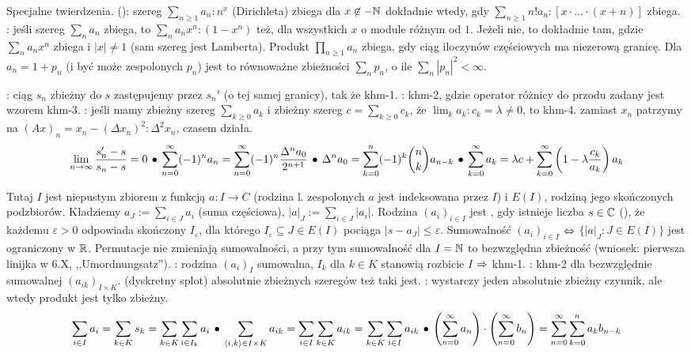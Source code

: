 Specjalne twierdzenia.
 (): szereg $\sum_{n \ge 1} a_n : n^x$ (Dirichleta) zbiega dla $x \not \in - \mathbb{N}$ dokładnie wtedy, gdy $\sum_{n \ge 1} n! a_n : [x \cdot \ldots \cdot (x+n)]$ zbiega.
: jeśli szereg $\sum_n a_n$ zbiega, to $\sum_n a_n x^n : (1 - x^n)$ też, dla wszystkich $x$ o module różnym od $1$.
Jeżeli nie, to dokładnie tam, gdzie $\sum_n a_nx^n$ zbiega i $|x| \neq 1$ (sam szereg jest Lamberta).
Produkt $\prod_{n \ge 1} a_n$ zbiega, gdy ciąg iloczynów częściowych ma niezerową granicę.
Dla $a_n = 1 + p_n$ (i być może zespolonych $p_n$) jest to równoważne zbieżności $\sum_n p_n$, o ile $\sum_n |p_n|^2 < \infty$.

:  ciąg $s_n$ zbieżny do $s$ zastępujemy przez $s_n'$ (o tej samej granicy), tak że khm-1.
: khm-2, gdzie operator różnicy do przodu zadany jest wzorem khm-3.
: jeśli mamy zbieżny szereg $\sum_{k \ge 0} a_k$ i zbieżny szereg $c = \sum_{k \ge 0} c_k$, że $\lim_k a_k : c_k = \lambda \neq 0$, to khm-4. 
 zamiast $x_n$ patrzymy na $(Ax)_n = x_n - (\Delta x_n)^2 : \Delta^2 x_n$, czasem działa. %
\[
	\lim_{n \to \infty} \frac{s_n' - s}{s_n - s} = 0 \, \bullet \,
	\sum_{n=0}^\infty (-1)^n a_n = \sum_{n=0}^\infty (-1)^n \frac{\Delta^n a_0}{2^{n+1}} \, \bullet \,
	\Delta^n a_0 = \sum_{k=0}^n (-1)^k {n \choose k} a_{n-k} \, \bullet \,
	\sum_{k=0}^\infty a_k = \lambda c + \sum_{k = 0} ^\infty \left(1 - \lambda \frac {c_k}{a_k}\right) a_k
\]

Tutaj  $I$ jest niepustym zbiorem z funkcją $a \colon I \to C$ (rodzina l. zespolonych $a$ jest indeksowana przez $I$) i $E(I)$, rodziną jego skończonych podzbiorów.
Kładziemy $a_J := \sum_{i \in J} a_i$ (suma częściowa), $|a|_J := \sum_{i \in J} |a_i|$.
Rodzina $(a_i)_{i \in I}$ jest , gdy istnieje liczba $s \in \mathbb{C}$ (), że każdemu $\varepsilon > 0$ odpowiada skończony $I_\varepsilon$, dla którego $I_\varepsilon \subseteq J \in E(I)$ pociąga $|s - a_J| \le \varepsilon$.
Sumowalność $(a_i)_{i \in I}$ $\Leftrightarrow$ $\{|a|_J : J \in E(I)\}$ jest ograniczony w $\mathbb{R}$.
Permutacje nie zmieniają sumowalności, a przy tym sumowalność dla $I = \mathbb{N}$ to bezwzględna zbieżność (wniosek: pierwsza linijka w 6.X, ,,Umordnungsatz'').
: rodzina $(a_i)_I$ sumowalna, $I_k$ dla $k \in K$ stanowią rozbicie $I$ $\Rightarrow$ khm-1. %
: khm-2 dla bezwzględnie sumowalnej $(a_{ik})_{I \times K}$.
 (dyskretny splot) absolutnie zbieżnych szeregów też taki jest.
: wystarczy jeden absolutnie zbieżny czynnik, ale wtedy produkt jest tylko zbieżny.
\[
	\sum_{i \in I} a_i = \sum_{k\in K} s_k = \sum_{k\in K} \sum_{i \in I_k} a_i \, \bullet \,
	\sum_{\langle i, k\rangle \in I \times K} a_{ik} = \sum_{i \in I} \sum_{k \in K} a_{ik} = \sum_{k \in K} \sum_{i \in I} a_{ik} \, \bullet \,
	\left(\sum_{n=0}^\infty a_n\right) \cdot \left(\sum_{n=0}^\infty b_n \right) = \sum_{n=0}^\infty \sum_{k=0}^n a_kb_{n-k}
\]

